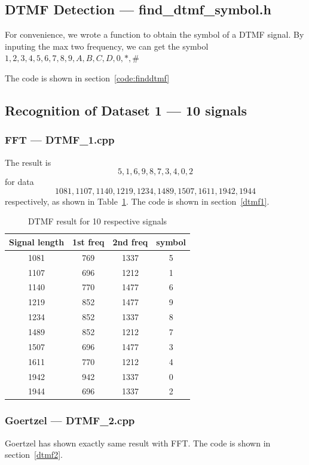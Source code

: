 \subsection{DTMF Detection --- find\_dtmf\_symbol.h}
For convenience, we wrote a function to obtain the symbol of a DTMF signal.
By inputing the max two frequency, we can get the symbol $1,2,3,4,5,6,7,8,9,A,B,C,D,0,*,\#$

The code is shown in section~\ref{code:finddtmf}


\subsection{Recognition of Dataset 1 --- 10 signals}
	
\subsubsection{FFT --- DTMF\_1.cpp}
The result is 
$$5,1,6,9,8,7,3,4,0,2$$
for data
$$1081,1107,1140,1219,1234,1489,1507,1611,1942,1944$$
respectively, as shown in Table~\ref{tab:result}.
The code is shown in section~\ref{dtmf1}.

\begin{table}[htp]
\centering
{\small
\begin{tabular}{c|ccc}
    \hline
    \textbf{Signal length} & \textbf{1st freq} & \textbf{2nd freq} & \textbf{symbol} \\ 
    \hline
	   1081 & 769 & 1337 & 5 \\
	   1107 & 696 & 1212 & 1 \\
	   1140 & 770 & 1477 & 6 \\
	   1219 & 852 & 1477 & 9 \\
	   1234 & 852 & 1337 & 8 \\
	   1489 & 852 & 1212 & 7 \\
	   1507 & 696 & 1477 & 3 \\
	   1611 & 770 & 1212 & 4 \\
	   1942 & 942 & 1337 & 0 \\
	   1944 & 696 & 1337 & 2 \\
	\hline
\end{tabular}
}
\vspace{-0.1in}
\caption{DTMF result for 10 respective signals}
\label{tab:result}
\end{table}

\subsubsection{Goertzel --- DTMF\_2.cpp}
Goertzel has shown exactly same result with FFT. The code is shown in section~\ref{dtmf2}.








